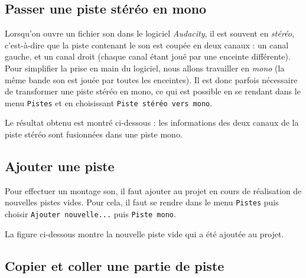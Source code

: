 \subsection{Passer une piste stéréo en mono}\label{Son1stereoMono} 

Lorsqu'on ouvre un fichier son dans le logiciel \emph{Audacity}, il est souvent en \emph{stéréo}, c'est-à-dire que la piste contenant le son est coupée en deux canaux : un canal gauche, et un canal droit (chaque canal étant joué par une enceinte différente). Pour simplifier la prise en main du logiciel, nous allons travailler en \emph{mono} (la même bande son est jouée par toutes les enceintes). Il est donc parfois nécessaire de transformer une piste stéréo en mono, ce qui est possible en se rendant dans le menu \texttt{Pistes} et en choisissant \texttt{Piste stéréo vers mono}.    


Le résultat obtenu est montré ci-dessous : les informations des deux canaux de la piste stéréo sont fusionnées dans une piste mono.





\subsection{Ajouter une piste}\label{Son1ajouterPiste}

Pour effectuer un montage son, il faut ajouter au projet en cours de réalisation de nouvelles pistes vides. Pour cela, il faut se rendre dans le menu \texttt{Pistes} puis choisir \texttt{Ajouter nouvelle...} puis \texttt{Piste mono}.   


La figure ci-dessous montre la nouvelle piste vide qui a été ajoutée au projet.






\subsection{Copier et coller une partie de piste}\label{Son1copierColler} 

